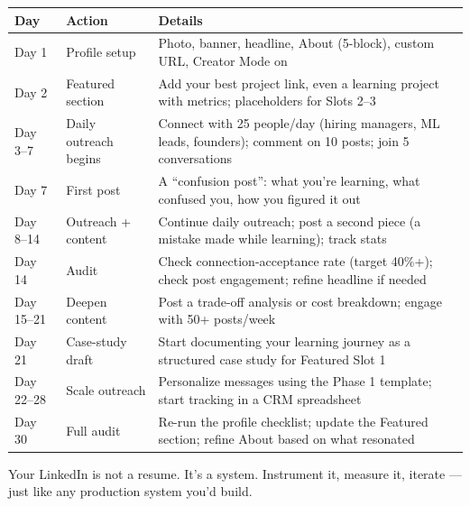 \begin{longtable}{p{} p{} p{}}
\toprule
\textbf{Day} & \textbf{Action} & \textbf{Details} \\
\midrule
\endhead
Day 1 & Profile setup & Photo, banner, headline, About (5-block), custom URL, Creator Mode on \\
Day 2 & Featured section & Add your best project link, even a learning project with metrics; placeholders for
Slots 2--3 \\
Day 3--7 & Daily outreach begins & Connect with 25 people/day (hiring managers, ML leads, founders); comment on
10 posts; join 5 conversations \\
Day 7 & First post & A ``confusion post'': what you're learning, what confused you, how you figured it out \\
Day 8--14 & Outreach + content & Continue daily outreach; post a second piece (a mistake made while learning);
track stats \\
Day 14 & Audit & Check connection-acceptance rate (target 40\%+); check post engagement; refine headline if
needed \\
Day 15--21 & Deepen content & Post a trade-off analysis or cost breakdown; engage with 50+ posts/week \\
Day 21 & Case-study draft & Start documenting your learning journey as a structured case study for Featured Slot
1 \\
Day 22--28 & Scale outreach & Personalize messages using the Phase 1 template; start tracking in a CRM
spreadsheet \\
Day 30 & Full audit & Re-run the profile checklist; update the Featured section; refine About based on what
resonated \\
\bottomrule
\end{longtable}

\begin{keytakeaway}
Your LinkedIn is not a resume. It's a system. Instrument it, measure it, iterate --- just like any production
system you'd build.
\end{keytakeaway}

